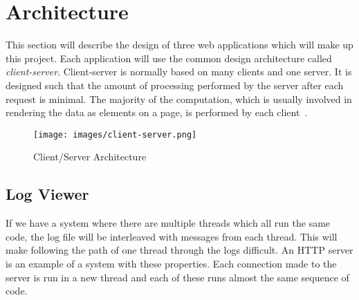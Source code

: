 

\section{Architecture}

This section will describe the design of three web applications which will make up this project. Each application will use the common design architecture called \emph{client-server}. Client-server is normally based on many clients and one server. It is designed such that the amount of processing performed by the server after each request is minimal. The majority of the computation, which is usually involved in rendering the data as elements on a page, is performed by each client~\cite{bib:dist_arch}.

\begin{figure}
  \texttt{[image: images/client-server.png]}
  \caption{Client/Server Architecture}
  \label{fig:client_server}
\end{figure}

\subsection{Log Viewer}
If we have a system where there are multiple threads which all run the same code, the log file will be interleaved with messages from each thread. This will make following the path of one thread through the logs difficult. An HTTP server is an example of a system with these properties. Each connection made to the server is run in a new thread and each of these runs almost the same sequence of code.

